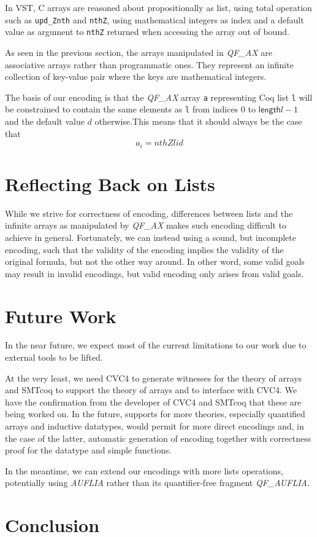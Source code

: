 \documentclass[10pt]{article}
\begin{document}
In VST, C arrays are reasoned about propositionally as list, using total operation such as \lstinline|upd_Znth| and \lstinline|nthZ|, using mathematical integers as index and a default value as argument to \lstinline|nthZ| returned when accessing the array out of bound. 

As seen in the previous section, the arrays manipulated in \emph{QF\_AX} are associative arrays rather than programmatic ones. They represent an infinite collection of key-value pair where the keys are mathematical integers. 

The basis of our encoding is that the \emph{QF\_AX} array \lstinline|a| representing Coq list \lstinline|l| will be constrained to contain the same elements as \lstinline|l| from indices $0$ to $\mathsf{length} l - 1$ and the default value $d$ otherwise.This means that it should always be the case that
$$ a_i = nthZ l i d$$




\section{Reflecting Back on Lists}
While we strive for correctness of encoding, differences between lists
and the infinite arrays as manipulated by \emph{QF\_AX} makes such encoding difficult to achieve in general. 
Fortunately, we can instead using a sound, but incomplete encoding, such that the validity 
of the encoding implies the validity of the original formula, but not the other way around.
In other word, some valid goals may result in invalid encodings, but valid encoding only arises from valid goals.






\section{Future Work}
In the near future, we expect most of the current limitations to our work due to external tools to be lifted.

At the very least, we need CVC4 to generate witnesses for the theory of arrays and SMTcoq to support the theory of arrays and to interface with CVC4. We have the confirmation from the developer of CVC4 and SMTcoq that these are being worked on. In the future, supports for more theories, especially quantified arrays and inductive datatypes, would permit for more direct encodings and, in the case of the latter, automatic generation of encoding together with correctness proof for the datatype and simple functions.

In the meantime, we can extend our encodings with more lists operations, potentially using \emph{AUFLIA} rather than its quantifier-free fragment \emph{QF\_AUFLIA}.
\section{Conclusion}
\end{document}
